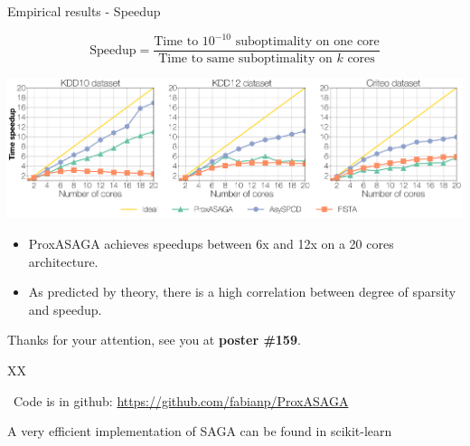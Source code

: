 \documentclass[10pt, notes]{beamer}
\begin{document}
\begin{frame}{Empirical results - Speedup}

$$
\text{Speedup} = \frac{\text{Time to $10^{-10}$ suboptimality 
on one core}}{\text{Time to same suboptimality on $k$ cores}}
$$

\includegraphics[width=\linewidth]{img/prox_asaga_2}

\begin{itemize}
\pause \item ProxASAGA achieves speedups between 6x and 12x on a 20 cores architecture.

\pause \vspace{0.5em}\item As predicted by theory, there is a high correlation between degree of sparsity and speedup.
\end{itemize}

\pause Thanks for your attention, see you at {\bfseries poster \#159}.
\end{frame}

\begin{frame}{XX}

\faGithub~Code is in github: \url{https://github.com/fabianp/ProxASAGA}

A very efficient implementation of SAGA can be found in scikit-learn
\end{frame}
\end{document}
